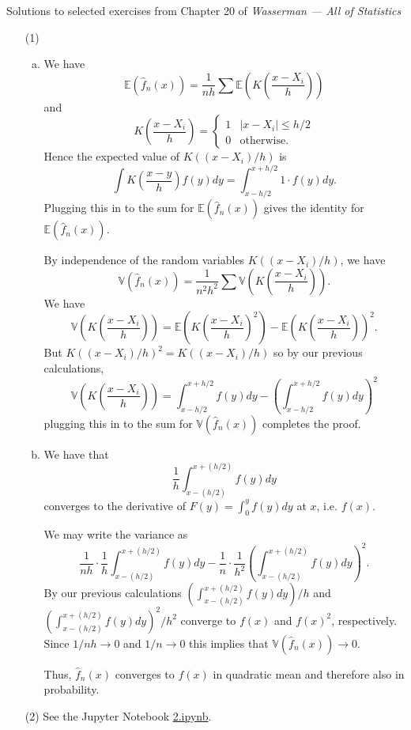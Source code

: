 \documentclass[10pt]{article}
\newcommand{\V}{\mathbb{V}}
\newcommand{\E}{\mathbb{E}}
\begin{document}
\noindent \large{Solutions to selected exercises from Chapter 20 of
\emph{Wasserman --- All of Statistics}}

\begin{enumerate}

\item[(1)]
\begin{enumerate}[(a)]
\item We have
\[
\E(\hat f_n(x)) = \frac{1}{nh}\sum \E\left(K\left(\frac{x-X_i}{h}\right)\right)
\]
and
\[
K\left(\frac{x-X_i}{h}\right) =
\begin{cases}
1 & |x-X_i| \leq h/2 \\
0 & \text{otherwise}.
\end{cases}
\]
Hence the expected value of $K((x-X_i)/h)$ is
\[
\int K\left(\frac{x-y}{h}\right)f(y)dy = \int_{x-h/2}^{x+h/2} 1 \cdot f(y)dy.
\]
Plugging this in to the sum for $\E(\hat f_n(x))$ gives the identity for
$\E(\hat f_n(x))$.

By independence of the random variables $K((x-X_i)/h)$, we have
\[
\V(\hat f_n(x)) = \frac{1}{n^2h^2}\sum \V\left(K\left(\frac{x-X_i}{h}\right)\right).
\]
We have
\[
\V\left(K\left(\frac{x-X_i}{h}\right)\right) =
\E\left(K\left(\frac{x-X_i}{h}\right)^2\right) -
\E\left(K\left(\frac{x-X_i}{h}\right)\right)^2.
\]
But $K((x-X_i)/h)^2=K((x-X_i)/h)$ so by our previous calculations,
\[
\V\left(K\left(\frac{x-X_i}{h}\right)\right)
=
\int_{x-h/2}^{x+h/2}f(y)dy - \left(\int_{x-h/2}^{x+h/2}f(y)dy\right)^2
\]
plugging this in to the sum for $\V(\hat f_n(x))$ completes the proof.

\item We have that
\[
\frac{1}{h}\int_{x-(h/2)}^{x+(h/2)}f(y)dy
\]
converges to the derivative of $F(y)=\int_0^y f(y)dy$ at $x$, i.e. $f(x)$.

We may write the variance as
\[
\frac{1}{nh} \cdot \frac{1}{h} \int_{x-(h/2)}^{x+(h/2)}f(y)dy
-
\frac{1}{n} \cdot \frac{1}{h^2} \left(\int_{x-(h/2)}^{x+(h/2)} f(y)dy\right)^2.
\]
By our previous calculations $(\int_{x-(h/2)}^{x+(h/2)}f(y)dy)/h$ and
$(\int_{x-(h/2)}^{x+(h/2)}f(y)dy)^2/h^2$ converge to $f(x)$ and $f(x)^2$,
respectively. Since $1/nh\to 0$ and $1/n\to 0$ this implies that $\V(\hat f_n(x))\to 0$.

Thus, $\hat f_n(x)$ converges to $f(x)$ in quadratic mean and therefore
also in probability.
\end{enumerate}

\item[(2)]
See the Jupyter Notebook
\href{https://github.com/ajrasmus/some_of_statistics/blob/main/chapter_20/2.ipynb}{2.ipynb}.


\end{enumerate}
\end{document}
